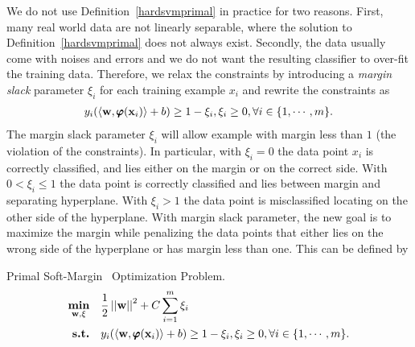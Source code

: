 {%
We do not use Definition~\ref{hardsvmprimal} in practice for two reasons. 
First, many real world data are not linearly separable, where the solution to Definition~\ref{hardsvmprimal} does not always exist.
Secondly, the data usually come with noises and errors and we do not want the resulting classifier to over-fit the training data.
Therefore, we relax the constraints by introducing a \textit{margin slack} parameter $\xi_i$ for each training example $x_i$ and rewrite the constraints as 
\begin{align}
	y_i(\langle \mathbf {w}, \pmb \varphi(\mathbf {x}_i) \rangle + b) \ge 1-\xi_i, \xi_i\ge 0, \forall i\in\{1,\cdots,m\}. \label{softsvmconstraint}
\end{align}
The margin slack parameter $\xi_i$ will allow example with margin less than $1$ (the violation of the constraints).
In particular, with $\xi_i=0$ the data point $x_i$ is correctly classified, and lies either on the margin or on the correct side.
With $0<\xi_i\le 1$ the data point is correctly classified and lies between margin and separating hyperplane.
With $\xi_i>1$ the data point is misclassified locating on the other side of the hyperplane.
With margin slack parameter, the new goal is to maximize the margin while penalizing the data points that either lies on the wrong side of the hyperplane or has margin less than one.
This can be defined by
\begin{definition}{Primal Soft-Margin \svm\ Optimization Problem.}\label{softsvmprimal}
	\begin{align*}
		\underset{\mathbf {w},\xi}{\textbf{min}} & \quad\frac{1}{2}\left|\left| \mathbf {w} \right|\right|^2 + C\sum_{i=1}^{m}\xi_i\\
		\textbf{s.t.} & \quad y_i(\langle \mathbf {w}, \pmb \varphi(\mathbf {x}_i) \rangle + b) \ge 1-\xi_i, \xi_i\ge 0, \forall i\in\{1,\cdots,m\}.
	\end{align*}
\end{definition}

}
